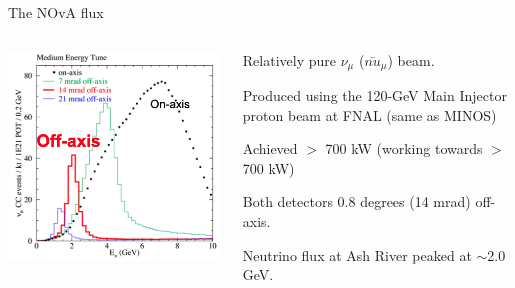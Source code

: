 \begin{frame}{The NOvA flux}
  \begin{columns}
    \begin{column}{0.55\textwidth}
       \includegraphics[width=0.99\textwidth]{./images/3nu/accelerator/nova_flux}
    \end{column}
    \begin{column}{0.45\textwidth}
      \begin{itemize}
      {\scriptsize
        \item Relatively pure $\nu_{\mu}$ ($\bar{nu}_{\mu}$) beam.
        \item Produced using the 120-GeV Main Injector proton beam at FNAL (same as MINOS)
        \item Achieved $>$ 700 kW (working towards $>$ 700 kW)
        \item Both detectors 0.8 degrees (14 mrad) off-axis.
        \item Neutrino flux at Ash River peaked at $\sim$2.0 GeV.
      }
      \end{itemize}
    \end{column}
  \end{columns}

\end{frame}
%
%
%

